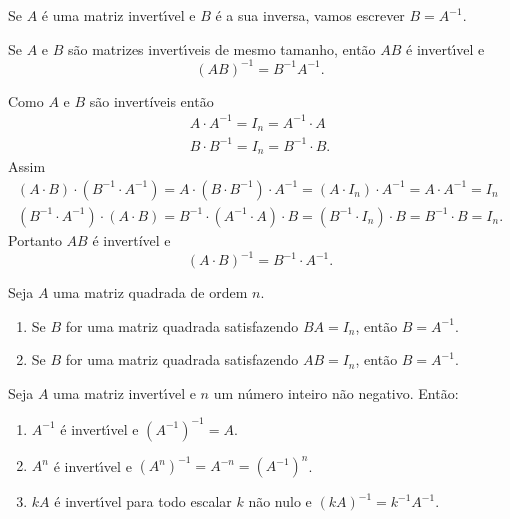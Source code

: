 \begin{notacao}
    Se $A$ \'e uma matriz invert{\'\i}vel e $B$ \'e a sua inversa, vamos escrever $B = A^{-1}$.
\end{notacao}

\begin{proposicao}
    Se $A$ e $B$ s\~ao matrizes invert{\'\i}veis de mesmo tamanho, ent\~ao $AB$ \'e invert{\'\i}vel e
    \[
        (AB)^{-1} = B^{-1} A^{-1}.
    \]
\end{proposicao}
\begin{prova}
    Como $A$ e $B$ são invertíveis então
    \begin{align*}
        A\cdot A^{-1} = I_n = A^{-1}\cdot A\\
        B\cdot B^{-1} = I_n = B^{-1}\cdot B.
    \end{align*}
    Assim
    \begin{align*}
        (A\cdot B)\cdot (B^{-1}\cdot A^{-1}) = A \cdot (B \cdot B^{-1})\cdot A^{-1} = (A \cdot I_n) \cdot A^{-1} = A\cdot A^{-1} = I_n\\
        (B^{-1}\cdot A^{-1}) \cdot (A\cdot B) = B^{-1}\cdot (A^{-1} \cdot A)\cdot B = (B^{-1} \cdot I_n) \cdot B = B^{-1}\cdot B = I_n.
    \end{align*}
    Portanto $AB$ é invertível e
    \[
        (A\cdot B)^{-1} = B^{-1}\cdot A^{-1}.
    \]
\end{prova}

\begin{teorema}
    Seja $A$ uma matriz quadrada de ordem $n$.
    \begin{enumerate}
        \item Se $B$ for uma matriz quadrada satisfazendo $BA = I_n$, então $B = A^{-1}$.
        \item Se $B$ for uma matriz quadrada satisfazendo $AB = I_n$, então $B = A^{-1}$.
    \end{enumerate}
\end{teorema}

\begin{proposicao}
    Seja $A$ uma matriz invert{\'\i}vel e $n$ um n\'umero inteiro n\~ao negativo. Ent\~ao:
    \begin{enumerate}[label={\roman*})]
        \item $A^{-1}$ \'e invert{\'\i}vel e $(A^{-1})^{-1} = A$.

        \item $A^n$ \'e invert{\'\i}vel e $(A^n)^{-1} = A^{-n} = (A^{-1})^n$.

        \item $kA$ \'e invert{\'\i}vel para todo escalar $k$ n\~ao nulo e $(kA)^{-1} = k^{-1}A^{-1}$.
    \end{enumerate}
\end{proposicao}

